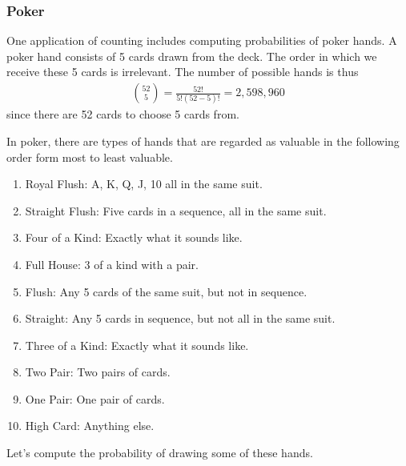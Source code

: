 \documentclass[11pt,letterpaper]{article}
\numberwithin{theorem}{section}
\numberwithin{definition}{section}
\numberwithin{lemma}{section}
\numberwithin{corollary}{section}
\numberwithin{proposition}{section}
\theoremstyle{definition}
\numberwithin{remark}{section}
\numberwithin{claim}{section}
\numberwithin{observation}{section}
\numberwithin{fact}{section}
\numberwithin{assumption}{section}
\numberwithin{example}{section}
\numberwithin{exercise}{section}
\begin{document}
\subsubsection{Poker}
One application of counting includes computing probabilities of poker hands. A poker hand consists of 5 cards drawn from the deck. The order in which we receive these 5 cards is irrelevant. The number of possible hands is thus
\begin{align*}
\binom{52}{5} = \frac{52!}{5!(52 - 5)!} = 2,598,960
\end{align*}
since there are 52 cards to choose 5 cards from. 

In poker, there are types of hands that are regarded as valuable in the following order form most to least valuable.
\begin{enumerate}
\item Royal Flush: A, K, Q, J, 10 all in the same suit.
\item Straight Flush: Five cards in a sequence, all in the same suit.
\item Four of a Kind: Exactly what it sounds like.
\item Full House: 3 of a kind with a pair.
\item Flush: Any 5 cards of the same suit, but not in sequence.
\item Straight: Any 5 cards in sequence, but not all in the same suit.
\item Three of a Kind: Exactly what it sounds like.
\item Two Pair: Two pairs of cards.
\item One Pair: One pair of cards.
\item High Card: Anything else.
\end{enumerate}
Let's compute the probability of drawing some of these hands. 
\end{document}
